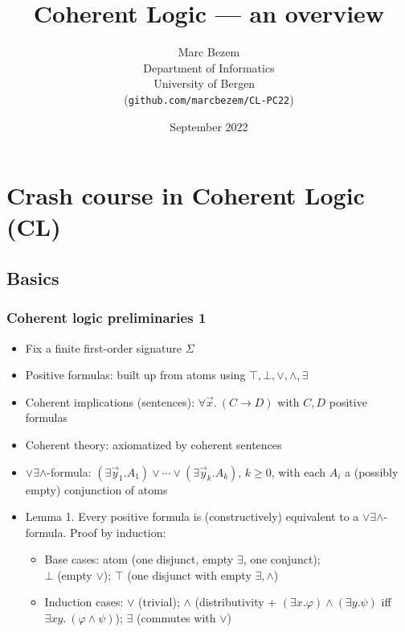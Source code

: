 \documentclass[handout,11pt]{beamer}
\title{Coherent Logic --- an overview}
\author{Marc Bezem\\
Department of Informatics\\
University of Bergen
\mbox{ }\\
({\tt github.com/marcbezem/CL-PC22})
}
\date{September 2022}
\newcommand{\deca}{${\lor}{\exists}{\land}$}
\begin{document}
\frame{\titlepage}

\section[Outline]{}
\frame{\tableofcontents}


\section{Crash course in Coherent Logic (CL)}

\subsection{Basics}

\begin{frame}
\frametitle{Coherent logic preliminaries 1}
 \begin{itemize}[<+->]   %
    \item Fix a finite first-order signature $\Sigma$
    \item Positive formulas: built up from atoms using 
    $\top,\bot,\lor,\land,\exists$
    \item Coherent implications (sentences): $\forall\vec{x}.~(C \to D)$ 
    with $C,D$ positive formulas
    \item Coherent theory: axiomatized by coherent sentences
    \item \deca-formula: 
    $(\exists\vec{y}_1.A_1) \lor \cdots \lor (\exists\vec{y}_k.A_k)$,
    $k\geq 0$, with each $A_i$ a (possibly empty) conjunction of atoms
    \item Lemma 1. Every positive formula is (constructively) equivalent to
    a \deca-formula. Proof by induction:
    \begin{itemize}[<+->]   %
    \item Base cases: atom (one disjunct, empty $\exists$, one conjunct);\\ 
    $\bot$ (empty $\lor$); 
    $\top$ (one disjunct with empty $\exists,\land$)
    \item Induction cases: $\lor$ (trivial); 
    $\land$ (distributivity + $(\exists x.\varphi) \land (\exists y.\psi)$ iff 
                              $\exists xy.~(\varphi\land\psi)$);
    $\exists$ (commutes with $\vee$)    
    \end{itemize}
 \end{itemize}
\end{frame}
\end{document}
